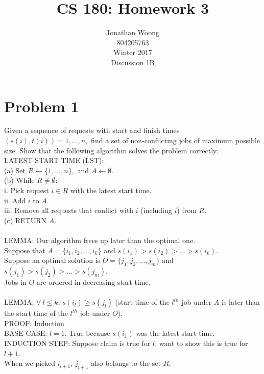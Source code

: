 \documentclass[11pt,letterpaper]{article}
\date{\displaydate{date}}
\newcommand\tab[1][1cm]{\hspace*{#1}}
\begin{document}
\title{CS 180: Homework 3}
\author{
	Jonathan Woong\\
	804205763\\
	Winter 2017\\
	Discussion 1B}
\maketitle
\pagebreak


\section{Problem 1}
Given a sequence of requests with start and finish times $(s(i),t(i)) = 1, \dots , n,$ find a set of non-conflicting jobs of maximum possible size. Show that the following algorithm solves the problem correctly: \\
LATEST START TIME (LST): \\
(a) Set $R \leftarrow \{1,\dots,n\},$ and $A \leftarrow \emptyset$. \\
(b) While $R \neq \emptyset$: \\
\tab i. Pick request $i \in R$ with the latest start time. \\
\tab ii. Add $i$ to $A$. \\
\tab iii. Remove all requests that conflict with $i$ (including $i$) from $R$. \\
(c) RETURN $A$. \\\\
LEMMA: Our algorithm frees up later than the optimal one. \\
Suppose that $A = \{i_1, i_2, \dots, i_k\}$ and $s(i_1)>s(i_2)>\dots>s(i_k)$. \\
Suppose an optimal solution is $O = \{j_1, j_2, \dots, j_m\}$ and $s(j_1)>s(j_2)>\dots>s(j_m)$. \\
Jobs in $O$ are ordered in decreasing start time. \\\\
LEMMA: $\forall \ l \leq k$, $s(i_l) \geq s(j_l)$ (start time of the $l^{th}$ job under $A$ is later than the start time of the $l^{th}$ job under $O$). \\
PROOF: Induction \\
\tab BASE CASE: $l = 1$. True because $s(i_1)$ was the latest start time. \\
\tab INDUCTION STEP: Suppose claim is true for $l$, want to show this is true for $l+1$. \\
\tab \tab When we picked $i_{l+1}$, $j_{i+1}$ also belongs to the set $R$. \\ 
\end{document}

